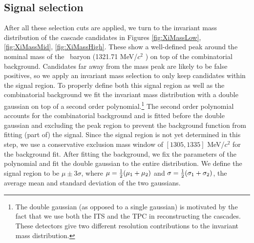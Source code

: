   \subsection{Signal selection}
    
    After all these selection cuts are applied, we turn to the invariant mass distribution of the cascade candidates in Figures \ref{fig:XiMassLow}, \ref{fig:XiMassMid}, \ref{fig:XiMassHigh}. These show a well-defined peak around the nominal mass of the \Xi\ baryon (1321.71 MeV/$c^2$ \cite{PDG2024}) on top of the combinatorial background. Candidates far away from the mass peak are likely to be false positives, so we apply an invariant mass selection to only keep candidates within the signal region. 
    To properly define both this signal region as well as the combinatorial background we fit the invariant mass distribution with a double gaussian on top of a second order polynomial.\footnote{The double gaussian (as opposed to a single gaussian) is motivated by the fact that we use both the ITS and the TPC in reconstructing the cascades. These detectors give two different resolution contributions to the invariant mass distribution.} The second order polynomial accounts for the combinatorial background and is fitted before the double gaussian and excluding the peak region to prevent the background function from fitting (part of) the signal. Since the signal region is not yet determined in this step, we use a conservative exclusion mass window of $[1305, 1335]$ MeV/$c^2$ for the background fit. After fitting the background, we fix the parameters of the polynomial and fit the double gaussian to the entire distribution. We define the signal region to be $\mu \pm 3\sigma$, where $\mu = \frac{1}{2}(\mu_1 + \mu_2)$ and $\sigma = \frac{1}{2}(\sigma_1 + \sigma_2)$, the average mean and standard deviation of the two gaussians. 
 
